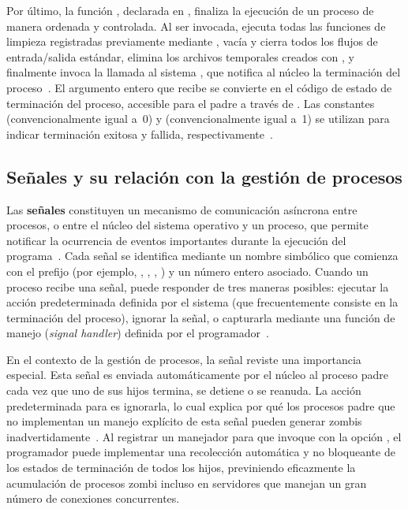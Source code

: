 Por último, la función , declarada en , finaliza la ejecución de un proceso de manera ordenada y controlada. Al ser invocada,  ejecuta todas las funciones de limpieza registradas previamente mediante , vacía y cierra todos los flujos de entrada/salida estándar, elimina los archivos temporales creados con , y finalmente invoca la llamada al sistema , que notifica al núcleo la terminación del proceso~\cite{kerrisk2010}. El argumento entero que recibe  se convierte en el código de estado de terminación del proceso, accesible para el padre a través de . Las constantes  (convencionalmente igual a~0) y  (convencionalmente igual a~1) se utilizan para indicar terminación exitosa y fallida, respectivamente~\cite{stevens2013}.

\subsection{Señales y su relación con la gestión de procesos}
\label{subsec:senales}

Las \textbf{señales} constituyen un mecanismo de comunicación asíncrona entre procesos, o entre el núcleo del sistema operativo y un proceso, que permite notificar la ocurrencia de eventos importantes durante la ejecución del programa~\cite{stevens2013}. Cada señal se identifica mediante un nombre simbólico que comienza con el prefijo  (por ejemplo, , , , ) y un número entero asociado. Cuando un proceso recibe una señal, puede responder de tres maneras posibles: ejecutar la acción predeterminada definida por el sistema (que frecuentemente consiste en la terminación del proceso), ignorar la señal, o capturarla mediante una función de manejo (\textit{signal handler}) definida por el programador~\cite{kerrisk2010}.

En el contexto de la gestión de procesos, la señal  reviste una importancia especial. Esta señal es enviada automáticamente por el núcleo al proceso padre cada vez que uno de sus hijos termina, se detiene o se reanuda. La acción predeterminada para  es ignorarla, lo cual explica por qué los procesos padre que no implementan un manejo explícito de esta señal pueden generar zombis inadvertidamente~\cite{love2013}. Al registrar un manejador para  que invoque  con la opción , el programador puede implementar una recolección automática y no bloqueante de los estados de terminación de todos los hijos, previniendo eficazmente la acumulación de procesos zombi incluso en servidores que manejan un gran número de conexiones concurrentes.

